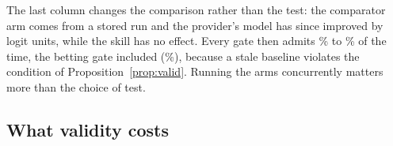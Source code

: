 The last column changes the comparison rather than the test: the comparator arm comes from a stored run and the provider's model has since improved by \PDrift{} logit units, while the skill has no effect. Every gate then admits \NEOneStaleMin\% to \NEOneStaleMax\% of the time, the betting gate included (\NEOneStaleBet\%), because a stale baseline violates the condition of Proposition~\ref{prop:valid}. Running the arms concurrently matters more than the choice of test.

\begin{table}[t]
\centering\small
\caption{False-admission rate (\%) by gate and null configuration (E1, E8). Boundary: $\Delta=\delta=0$ under the default model. Worst case: every pair discordant. Stale baseline: the comparator arm is from an earlier model snapshot. SWE null: the SWE-Skills-Bench differences with random signs. Dashes: the discordant-pair SPRT is defined only for one pass/fail attempt per arm at $\delta=0$, so it is not run with $r=3$, with a margin, or on batch pass rates.}
\label{tab:false}
\resizebox{\linewidth}{!}{}
\end{table}

\subsection{What validity costs}
\label{sec:res-cost}

